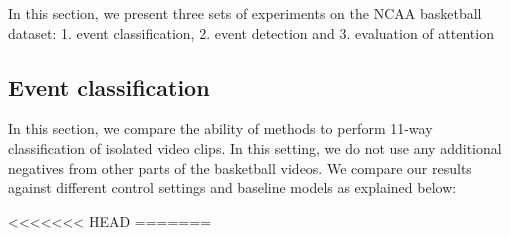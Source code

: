 In this section, we present three sets of experiments on the NCAA basketball
dataset: 1. event classification, 2. event detection and 3. evaluation of
attention



\subsection{Event classification}

In this section, we compare the ability of methods to perform 11-way classification of isolated video clips.
In this setting, we do not use any
additional negatives from other parts of the basketball videos.
We compare our results
against different control settings and baseline models as explained
below:

<<<<<<< HEAD
=======

